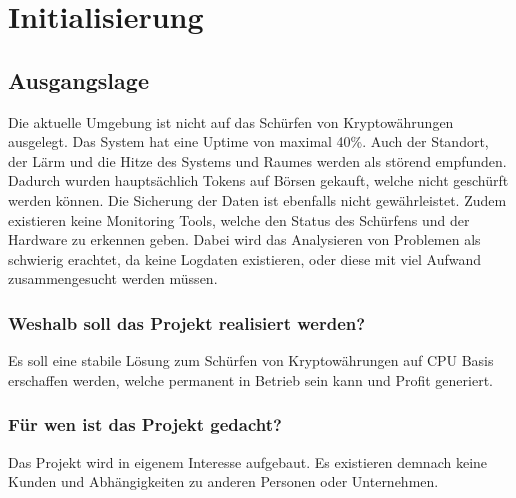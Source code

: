\section{Initialisierung}
\subsection{Ausgangslage}
Die aktuelle Umgebung ist nicht auf das Schürfen von Kryptowährungen ausgelegt. Das System hat eine Uptime von maximal 40\%. Auch der Standort, der Lärm und die Hitze des Systems und Raumes werden als störend empfunden. Dadurch wurden hauptsächlich Tokens auf Börsen gekauft, welche nicht geschürft werden können. Die Sicherung der Daten ist ebenfalls nicht gewährleistet. Zudem existieren keine Monitoring Tools, welche den Status des Schürfens und der Hardware zu erkennen geben. Dabei wird das Analysieren von Problemen als schwierig erachtet, da keine Logdaten existieren, oder diese mit viel Aufwand zusammengesucht werden müssen. 

\subsubsection{Weshalb soll das Projekt realisiert werden?}
Es soll eine stabile Lösung zum Schürfen von Kryptowährungen auf CPU Basis erschaffen werden, welche permanent in Betrieb sein kann und Profit generiert.

\subsubsection{Für wen ist das Projekt gedacht?}
Das Projekt wird in eigenem Interesse aufgebaut. Es existieren demnach keine Kunden und Abhängigkeiten zu anderen Personen oder Unternehmen.

